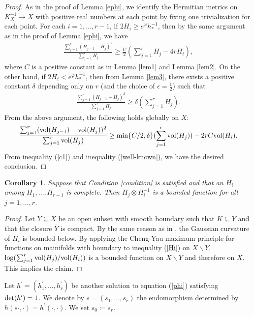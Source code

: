 \documentclass[12pt]{article}
\theoremstyle{definition}
\newtheorem{cor}[defi]{Corollary}
\def\det{{\rm det}}
\def\det{{\rm det}}
\def\refe{\ast}
\def\vol{{\rm vol}}
\def\min{{\rm min}}
\begin{document}
\begin{proof} As in the proof of Lemma \ref{ephi}, we identify the Hermitian metrics on $K_X^{-1}\rightarrow X$ with positive real numbers at each point by fixing one trivialization for each point. For each $i=1,\dots, r-1$, if $2H_i\geq e^{\varphi}h_\refe^{-1}$, then by the same argument as in the proof of Lemma \ref{ephi}, we have
\begin{align*}
\frac{\sum_{j=1}^r(H_{j-1}-H_j)^2}{\sum_{j=1}^rH_j}\geq \frac{C}{2}(\sum_{j=1}^rH_j-4rH_i),
\end{align*}
where $C$ is a positive constant as in Lemma \ref{lem1} and Lemma \ref{lem2}. On the other hand, if $2H_i<e^{\varphi}h_\refe^{-1}$, then from Lemma \ref{lem3}, there exists a positive constant $\delta$ depending only on $r$ (and the choice of $\epsilon=\frac{1}{2}$) such that
\begin{align*}
\frac{\sum_{j=1}^r(H_{j-1}-H_j)^2}{\sum_{j=1}^rH_j}\geq \delta (\sum_{j=1}^rH_j).
\end{align*}
From the above argument, the following holds globally on $X$:
\begin{align}
\frac{\sum_{j=1}^r(\vol(H_{j-1})-\vol(H_j))^2}{\sum_{j=1}^r\vol(H_j)}\geq \min\{C/2,\delta\}(\sum_{j=1}^r\vol(H_j))-2rC\vol(H_i). \label{c1}
\end{align}
From inequality (\ref{c1}) and inequality (\ref{well-known}), we have the desired conclusion.
\end{proof}
\begin{cor}\label{ji}{\it Suppose that Condition \ref{condition} is satisfied and that an $H_i$ among $H_1, \dots, H_{r-1}$ is complete. Then $H_j\otimes H_i^{-1}$ is a bounded function for all $j=1,\dots, r$. 
}
\end{cor}
\begin{proof} Let $Y\subseteq X$ be an open subset with smooth boundary such that $K\subseteq Y$ and that the closure $\overline{Y}$ is compact. By the same reason as in \cite[Lemma 2.4]{LM1}, the Gaussian curvature of $H_i$ is bounded below. By applying the Cheng-Yau maximum principle for functions on mainifolds with boundary to inequality (\ref{Hi}) on $X\backslash Y$, $\log(\sum_{j=1}^r\vol(H_j)/\vol(H_i))$ is a bounded function on $X\backslash Y$ and therefore on $X$. This implies the claim.
\end{proof}
Let $h^\prime=(h_1^\prime,\dots, h_r^\prime)$ be another solution to equation (\ref{phi}) satisfying $\det(h^\prime)=1$. We denote by $s=(s_1,\dots, s_r)$ the endomorphism determined by $h(s\cdot,\cdot)=h^\prime(\cdot,\cdot)$. We set $s_0\coloneqq s_r$.
\end{document}

